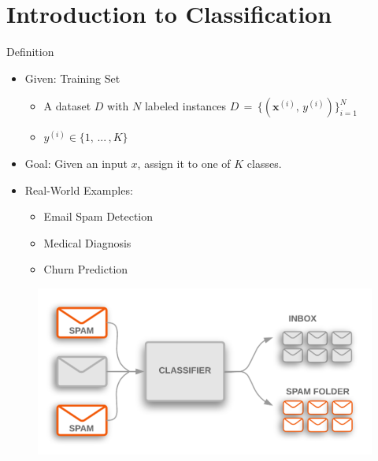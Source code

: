 \documentclass[serif, aspectratio=169]{beamer}
\begin{document}
\section{Introduction to Classification}
\begin{frame}{Definition}
    \begin{itemize}\itemsep2em
        \item Given: Training Set
        \begin{itemize}
            \item A dataset \(D\) with \(N\) labeled instances \(D \, = \, \{(\mathbf{x}^{(i)}, \, y^{(i)})\}^N_{i=1}\)
            \item $y^{(i)} \in \{1, \, ... \, , K\}$
        \end{itemize}
    \end{itemize}
    \begin{itemize}
        \item \justifying Goal: Given an input $x$, assign it to one of $K$ classes.
            \item Real-World Examples:
            \begin{itemize}
                \item Email Spam Detection
                \item Medical Diagnosis
                \item Churn Prediction
            \end{itemize}
    \end{itemize}
    \endminipage
    \hfill
    \begin{figure}
            \centering
            \includegraphics[width=\linewidth]{pic/Figure_30.png}
        \end{figure}
    \endminipage
\end{frame}
\end{document}
